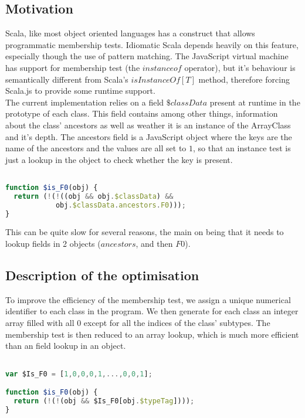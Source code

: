 \subsection{Motivation}
Scala, like most object oriented languages has a construct that allows
programmatic membership tests. Idiomatic Scala depends heavily on this feature,
especially though the use of pattern matching.
The JavaScript virtual machine has support for membership test (the
$instanceof$ operator), but it's behaviour is semantically different from
Scala's $isInstanceOf[T]$ method, therefore forcing Scala.js to provide some
runtime support. \\
The current implementation relies on a field $\$classData$ present at
runtime in the prototype of each class. This field contains among other things,
information about the class' ancestors as well as weather it is an instance of
the ArrayClass and it's depth. The ancestors field is a JavaScript object where
the keys are the name of the ancestors and the values are all set to $1$, so
that an instance test is just a lookup in the object to check whether the key
is present. 

\begin{lstlisting}[language=javascript,caption=Old membership test,
label={lst:oldIsInstanceOf}]

function $is_F0(obj) {
  return (!(!((obj && obj.$classData) && 
            obj.$classData.ancestors.F0)));
}

\end{lstlisting}
This can be quite slow for several reasons, the main on being that it needs to
lookup fields in 2 objects ($ancestors$, and then $F0$).\\

\subsection{Description of the optimisation}
To improve the efficiency of the membership test, we assign a unique numerical
identifier to each class in the program. We then generate for each class an
integer array filled with all 0 except for all the indices of the class'
subtypes. The membership test is then reduced to an array lookup, which is much
more efficient than an field lookup in an object. 

\begin{lstlisting}[language=javascript,caption=New membership test,
label={lst:newIsInstanceOf}]

var $Is_F0 = [1,0,0,0,1,...,0,0,1];

function $is_F0(obj) {
  return (!(!(obj && $Is_F0[obj.$typeTag])));
}

\end{lstlisting}


